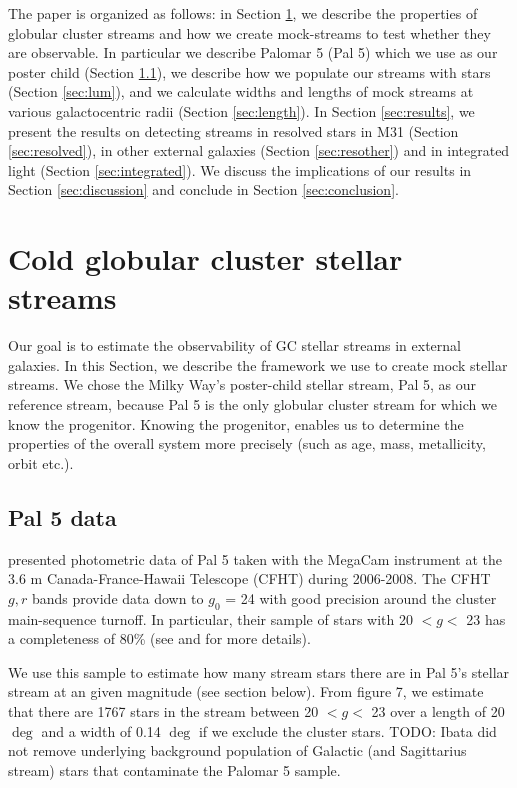 \documentclass[twocolumn]{aastex62}
\newcommand{\todo}[1]{{\color{red} TODO: #1}}
\begin{document}
The paper is organized as follows: in Section \ref{sec:coldstreams}, we describe the properties of globular cluster streams and how we create mock-streams to test whether they are observable. In particular we describe Palomar 5 (Pal 5) which we use as our poster child (Section \ref{sec:pal5}), we describe how we populate our streams with stars (Section \ref{sec:lum}), and we calculate widths and lengths of mock streams at various galactocentric radii (Section \ref{sec:length}). In Section \ref{sec:results}, we present the results on detecting streams in resolved stars in M31 (Section \ref{sec:resolved}), in other external galaxies (Section \ref{sec:resother}) and in integrated light (Section \ref{sec:integrated}). We discuss the implications of our results in Section \ref{sec:discussion} and conclude in Section \ref{sec:conclusion}.
%

\section{Cold globular cluster stellar streams}
\label{sec:coldstreams}
Our goal is to estimate the observability of GC stellar streams in external galaxies. In this Section, we describe the framework we use to create mock stellar streams.  We chose the Milky Way's poster-child stellar stream, Pal 5,  as our reference stream, because Pal 5 is the only globular cluster stream for which we know the progenitor. Knowing the progenitor, enables us to determine the properties of the overall system more precisely (such as age, mass, metallicity, orbit etc.). 

\subsection{Pal 5 data}
\label{sec:pal5}
 \citet{ibata16} presented photometric data of Pal 5 taken with the MegaCam instrument at the 3.6 m Canada-France-Hawaii Telescope (CFHT) during 2006-2008. The CFHT $g, r$ bands provide data down to $g_0$ = 24 with good precision around the cluster main-sequence turnoff. In particular, their sample of stars with 20 $< g <$ 23 has a completeness of 80\% (see \citealt{ibata16} and \citealt{ibata17} for more details). 
 
We use this sample to estimate how many stream stars there are in Pal 5's stellar stream at an given magnitude (see section below). From \citet{ibata16} figure 7, we estimate that there are 1767 stars in the stream between 20 $< g <$ 23 over a length of 20 $\deg$  and a width of 0.14 $\deg$ if we exclude the cluster stars. \todo{Ibata did not remove underlying background population of Galactic (and Sagittarius stream) stars that contaminate the Palomar 5 sample.}  
\end{document}
